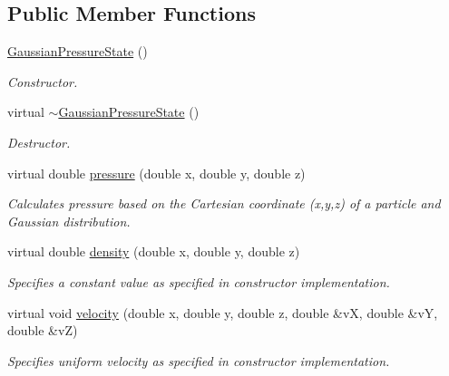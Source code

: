 \subsection*{Public Member Functions}
\begin{DoxyCompactItemize}
\item 
\hypertarget{classGaussianPressureState_aebc1f6cc2948ca0013f714fb944ac105}{\hyperlink{classGaussianPressureState_aebc1f6cc2948ca0013f714fb944ac105}{Gaussian\-Pressure\-State} ()}\label{classGaussianPressureState_aebc1f6cc2948ca0013f714fb944ac105}

\begin{DoxyCompactList}\small\item\em Constructor. \end{DoxyCompactList}\item 
\hypertarget{classGaussianPressureState_a2f6d732404d6fd0d84264f53316deda8}{virtual \hyperlink{classGaussianPressureState_a2f6d732404d6fd0d84264f53316deda8}{$\sim$\-Gaussian\-Pressure\-State} ()}\label{classGaussianPressureState_a2f6d732404d6fd0d84264f53316deda8}

\begin{DoxyCompactList}\small\item\em Destructor. \end{DoxyCompactList}\item 
virtual double \hyperlink{classGaussianPressureState_ab03eaaf1b46a20f69de5751b43695e36}{pressure} (double x, double y, double z)
\begin{DoxyCompactList}\small\item\em Calculates pressure based on the Cartesian coordinate (x,y,z) of a particle and Gaussian distribution. \end{DoxyCompactList}\item 
virtual double \hyperlink{classGaussianPressureState_a72005bf2a408899c05b90fa0353b60ce}{density} (double x, double y, double z)
\begin{DoxyCompactList}\small\item\em Specifies a constant value as specified in constructor implementation. \end{DoxyCompactList}\item 
virtual void \hyperlink{classGaussianPressureState_a77a4372d616bb894e84de284ec386a52}{velocity} (double x, double y, double z, double \&v\-X, double \&v\-Y, double \&v\-Z)
\begin{DoxyCompactList}\small\item\em Specifies uniform velocity as specified in constructor implementation. \end{DoxyCompactList}\end{DoxyCompactItemize}


